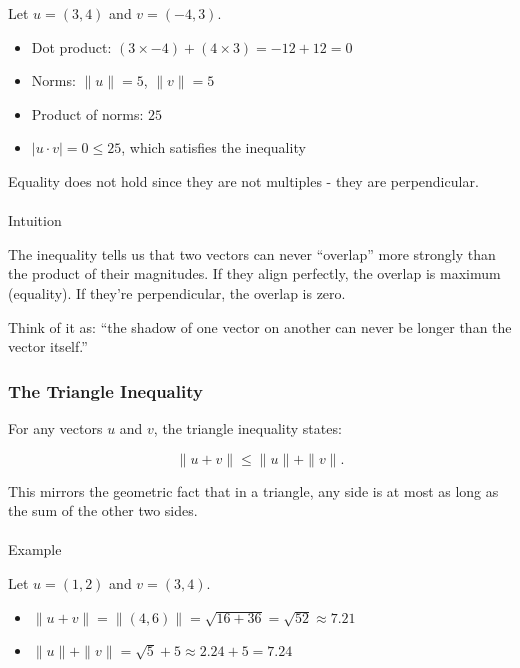 \documentclass[
  letterpaper,
  DIV=11,
  numbers=noendperiod]{scrreprt}
\makeatletter
\let\oldparagraph\paragraph
\renewcommand{\paragraph}{
    \@ifstar
      \xxxParagraphStar
      \xxxParagraphNoStar
  }
\newcommand{\xxxParagraphStar}[1]{\oldparagraph*{#1}\mbox{}}
\newcommand{\xxxParagraphNoStar}[1]{\oldparagraph{#1}\mbox{}}
\providecommand{\tightlist}{%
  \setlength{\itemsep}{0pt}\setlength{\parskip}{0pt}}
\makeatother
\begin{document}
Let \(u = (3, 4)\) and \(v = (-4, 3)\).

\begin{itemize}
\tightlist
\item
  Dot product: \((3 \times -4) + (4 \times 3) = -12 + 12 = 0\)\\
\item
  Norms: \(\|u\| = 5\), \(\|v\| = 5\)\\
\item
  Product of norms: \(25\)\\
\item
  \(|u \cdot v| = 0 \leq 25\), which satisfies the inequality
\end{itemize}

Equality does not hold since they are not multiples - they are
perpendicular.

\paragraph{Intuition}\label{intuition}

The inequality tells us that two vectors can never ``overlap'' more
strongly than the product of their magnitudes. If they align perfectly,
the overlap is maximum (equality). If they're perpendicular, the overlap
is zero.

Think of it as: ``the shadow of one vector on another can never be
longer than the vector itself.''

\subsubsection{The Triangle Inequality}\label{the-triangle-inequality}

For any vectors \(u\) and \(v\), the triangle inequality states:

\[
\|u + v\| \leq \|u\| + \|v\|.
\]

This mirrors the geometric fact that in a triangle, any side is at most
as long as the sum of the other two sides.

\paragraph{Example}\label{example-1}

Let \(u = (1, 2)\) and \(v = (3, 4)\).

\begin{itemize}
\tightlist
\item
  \(\|u + v\| = \|(4, 6)\| = \sqrt{16 + 36} = \sqrt{52} \approx 7.21\)\\
\item
  \(\|u\| + \|v\| = \sqrt{5} + 5 \approx 2.24 + 5 = 7.24\)
\end{itemize}
\end{document}
